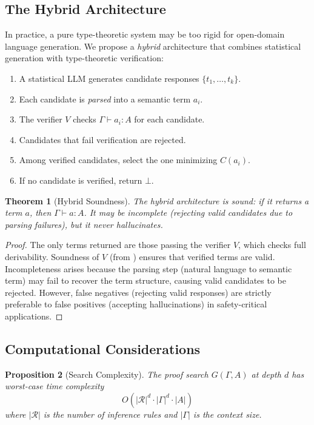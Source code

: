\documentclass[11pt,a4paper]{article}
\theoremstyle{plain}
\newtheorem{theorem}{Theorem}[section]
\newtheorem{proposition}[theorem]{Proposition}
\theoremstyle{definition}
\theoremstyle{remark}
\begin{document}
\subsection{The Hybrid Architecture}

In practice, a pure type-theoretic system may be too rigid for open-domain language generation.
We propose a \emph{hybrid} architecture that combines statistical generation with type-theoretic verification:

\begin{enumerate}[nosep]
  \item A statistical LLM generates candidate responses $\{t_1, \ldots, t_k\}$.
  \item Each candidate is \emph{parsed} into a semantic term $a_i$.
  \item The verifier $V$ checks $\Gamma \vdash a_i : A$ for each candidate.
  \item Candidates that fail verification are rejected.
  \item Among verified candidates, select the one minimizing $C(a_i)$.
  \item If no candidate is verified, return $\bot$.
\end{enumerate}

\begin{theorem}[Hybrid Soundness]\label{thm:hybrid-soundness}
The hybrid architecture is sound: if it returns a term $a$, then $\Gamma \vdash a : A$.
It may be incomplete (rejecting valid candidates due to parsing failures), but it never hallucinates.
\end{theorem}

\begin{proof}
The only terms returned are those passing the verifier $V$, which checks full derivability.
Soundness of $V$ (from ) ensures that verified terms are valid.
Incompleteness arises because the parsing step (natural language to semantic term) may fail to recover the term structure, causing valid candidates to be rejected.
However, false negatives (rejecting valid responses) are strictly preferable to false positives (accepting hallucinations) in safety-critical applications.
\end{proof}

\subsection{Computational Considerations}

\begin{proposition}[Search Complexity]\label{prop:complexity}
The proof search $G(\Gamma, A)$ at depth $d$ has worst-case time complexity
\[
  O(|\mathcal{R}|^d \cdot |\Gamma|^d \cdot |A|)
\]
where $|\mathcal{R}|$ is the number of inference rules and $|\Gamma|$ is the context size.
\end{proposition}
\end{document}
